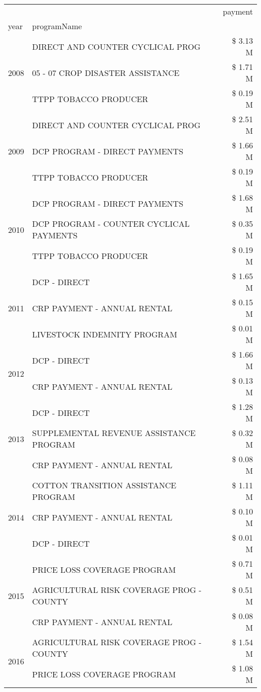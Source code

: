 \begin{tabular}{llr}
\toprule
 &  & payment \\
year & programName &  \\
\midrule
\multirow[t]{3}{*}{2008} & DIRECT AND COUNTER CYCLICAL PROG & \$ 3.13 M \\
 & 05 - 07 CROP DISASTER ASSISTANCE & \$ 1.71 M \\
 & TTPP TOBACCO PRODUCER & \$ 0.19 M \\
\cline{1-3}
\multirow[t]{3}{*}{2009} & DIRECT AND COUNTER CYCLICAL PROG & \$ 2.51 M \\
 & DCP PROGRAM - DIRECT PAYMENTS & \$ 1.66 M \\
 & TTPP TOBACCO PRODUCER & \$ 0.19 M \\
\cline{1-3}
\multirow[t]{3}{*}{2010} & DCP PROGRAM - DIRECT PAYMENTS & \$ 1.68 M \\
 & DCP PROGRAM - COUNTER CYCLICAL PAYMENTS & \$ 0.35 M \\
 & TTPP TOBACCO PRODUCER & \$ 0.19 M \\
\cline{1-3}
\multirow[t]{3}{*}{2011} & DCP - DIRECT & \$ 1.65 M \\
 & CRP PAYMENT - ANNUAL RENTAL & \$ 0.15 M \\
 & LIVESTOCK INDEMNITY PROGRAM & \$ 0.01 M \\
\cline{1-3}
\multirow[t]{2}{*}{2012} & DCP - DIRECT & \$ 1.66 M \\
 & CRP PAYMENT - ANNUAL RENTAL & \$ 0.13 M \\
\cline{1-3}
\multirow[t]{3}{*}{2013} & DCP - DIRECT & \$ 1.28 M \\
 & SUPPLEMENTAL REVENUE ASSISTANCE PROGRAM & \$ 0.32 M \\
 & CRP PAYMENT - ANNUAL RENTAL & \$ 0.08 M \\
\cline{1-3}
\multirow[t]{3}{*}{2014} & COTTON TRANSITION ASSISTANCE PROGRAM & \$ 1.11 M \\
 & CRP PAYMENT - ANNUAL RENTAL & \$ 0.10 M \\
 & DCP - DIRECT & \$ 0.01 M \\
\cline{1-3}
\multirow[t]{3}{*}{2015} & PRICE LOSS COVERAGE PROGRAM & \$ 0.71 M \\
 & AGRICULTURAL RISK COVERAGE PROG - COUNTY & \$ 0.51 M \\
 & CRP PAYMENT - ANNUAL RENTAL & \$ 0.08 M \\
\cline{1-3}
\multirow[t]{3}{*}{2016} & AGRICULTURAL RISK COVERAGE PROG - COUNTY & \$ 1.54 M \\
 & PRICE LOSS COVERAGE PROGRAM & \$ 1.08 M \\

\end{tabular}
